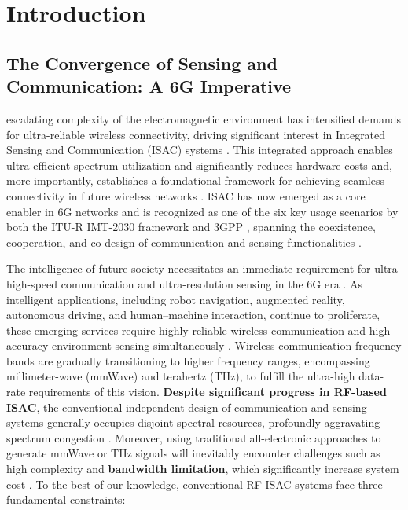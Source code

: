 \section{Introduction}
\label{sec:introduction}

\subsection{The Convergence of Sensing and Communication: A 6G Imperative}

 escalating complexity of the electromagnetic environment has intensified demands for ultra-reliable wireless connectivity, driving significant interest in Integrated Sensing and Communication (ISAC) systems \cite{O_ISAC_070}. This integrated approach enables ultra-efficient spectrum utilization and significantly reduces hardware costs and, more importantly, establishes a foundational framework for achieving seamless connectivity in future wireless networks \cite{O_ISAC_070}. ISAC has now emerged as a core enabler in 6G networks and is recognized as one of the six key usage scenarios by both the ITU-R IMT-2030 framework \cite{O_ISAC_162} and 3GPP \cite{O_ISAC_162}, spanning the coexistence, cooperation, and co-design of communication and sensing functionalities \cite{O_ISAC_070}.

The intelligence of future society necessitates an immediate requirement for ultra-high-speed communication and ultra-resolution sensing in the 6G era \cite{O_ISAC_016}. As intelligent applications, including robot navigation, augmented reality, autonomous driving, and human--machine interaction, continue to proliferate, these emerging services require highly reliable wireless communication and high-accuracy environment sensing simultaneously \cite{O_ISAC_351}. Wireless communication frequency bands are gradually transitioning to higher frequency ranges, encompassing millimeter-wave (mmWave) and terahertz (THz), to fulfill the ultra-high data-rate requirements of this vision. \textbf{Despite significant progress in RF-based ISAC}, the conventional independent design of communication and sensing systems generally occupies disjoint spectral resources, profoundly aggravating spectrum congestion \cite{O_ISAC_351}. Moreover, using traditional all-electronic approaches to generate mmWave or THz signals will inevitably encounter challenges such as high complexity and \textbf{bandwidth limitation}, which significantly increase system cost \cite{O_ISAC_286}. To the best of our knowledge, conventional RF-ISAC systems face three fundamental constraints:

